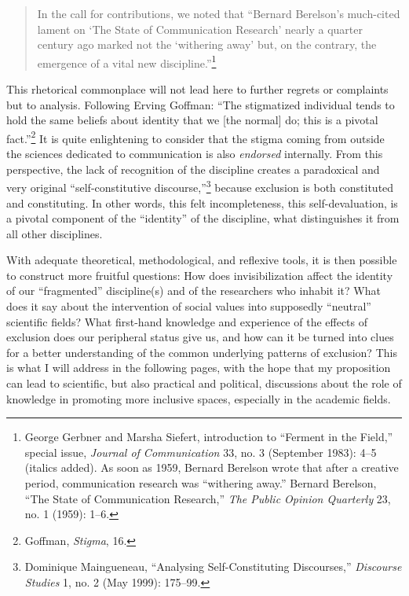 \documentclass{tufte-handout}
\begin{document}
\begin{quote}
In the call for contributions, we noted that ``Bernard Berelson's
much-cited lament on `The State of Communication Research' nearly a
quarter century ago marked not the `withering away' but, on the
contrary, the emergence of a vital new discipline.''\footnote{George
  Gerbner and Marsha Siefert, introduction to ``Ferment in the Field,''
  special issue, \emph{Journal of Communication} 33, no. 3 (September
  1983): 4--5 (italics added). As soon as 1959, Bernard Berelson wrote
  that after a creative period, communication research was ``withering
  away.'' Bernard Berelson, ``The State of Communication Research,''
  \emph{The Public Opinion Quarterly} 23, no. 1 (1959): 1--6.}
\end{quote}

\noindent This rhetorical commonplace will not lead here to further regrets or
complaints but to analysis. Following Erving Goffman: ``The stigmatized
individual tends to hold the same beliefs about identity that we {[}the
normal{]} do; this is a pivotal fact.''\footnote{Goffman, \emph{Stigma},
  16.} It is quite enlightening to consider that the stigma coming from
outside the sciences dedicated to communication is also \emph{endorsed}
internally. From this perspective, the lack of recognition of the
discipline creates a paradoxical and very original ``self-constitutive
discourse,''\footnote{Dominique Maingueneau, ``Analysing
  Self-Constituting Discourses,'' \emph{Discourse Studies} 1, no. 2 (May
  1999): 175--99.} because exclusion is both constituted and
constituting. In other words, this felt incompleteness, this
self-devaluation, is a pivotal component of the ``identity'' of the
discipline, what distinguishes it from all other disciplines.

With adequate theoretical, methodological, and reflexive tools, it is
then possible to construct more fruitful questions: How does
invisibilization affect the identity of our ``fragmented'' discipline(s)
and of the researchers who inhabit it? What does it say about the
intervention of social values into supposedly ``neutral'' scientific
fields? What first-hand knowledge and experience of the effects of
exclusion does our peripheral status give us, and how can it be turned
into clues for a better understanding of the common underlying patterns
of exclusion? This is what I will address in the following pages, with
the hope that my proposition can lead to scientific, but also practical
and political, discussions about the role of knowledge in promoting more
inclusive spaces, especially in the academic fields.
\end{document}
